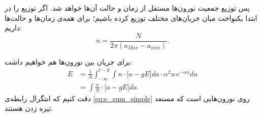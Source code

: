 پس توزیع جمعیت نورون‌‌ها مستقل از زمان و حالت آن‌ها خواهد شد. اگر توزیع را در ابتدا یکنواخت میان جریان‌های مختلف توزیع کرده باشیم؛ برای همه‌ی زمان‌ها و حالت‌ها داریم:
\begin{equation}
	n = \frac{N}{2 \pi (a_{Max} - a_{min}) }.
\end{equation}


برای جریان بین نورون‌ها هم خواهیم داشت:
\begin{align}
	E &= \frac{1}{N} \int_{- \infty}^{t - d} \int n \cdot \big[ a - g E \big] da \cdot \alpha^2 u\, e^{-\alpha u} du\\
	&=  \int \frac{n}{N} \cdot \big[ a - g E \big] da . \label{eq:e_sum_simple}
\end{align}
دقت کنیم که انتگرال رابطه‌ی \ref{eq:e_sum_simple} روی  نورون‌هایی است که مستعد تیزه زدن هستند.

